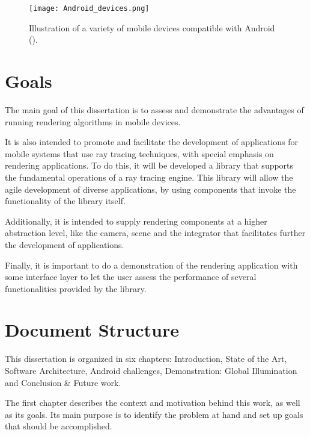 \begin{figure}[H]
	\centering
	\caption{Illustration of a variety of mobile devices compatible with Android (\cite{AndroidDevices}).}
	\label{Illustration of a variety of mobile devices compatible with Android}
	\texttt{[image: Android\_devices.png]}
\end{figure}


\section{Goals}

\par
The main goal of this dissertation is to assess and demonstrate the advantages of running rendering algorithms in mobile devices.

\par
It is also intended to promote and facilitate the development of applications for mobile systems that use ray tracing techniques, with special emphasis on rendering applications.
To do this, it will be developed a library that supports the fundamental operations of a ray tracing engine.
This library will allow the agile development of diverse applications, by using components that invoke the functionality of the library itself.

\par
Additionally, it is intended to supply rendering components at a higher abstraction level, like the camera, scene and the integrator that facilitates further the development of applications.

\par
Finally, it is important to do a demonstration of the rendering application with some interface layer to let the user assess the performance of several functionalities provided by the library.

\section{Document Structure}

\par
This dissertation is organized in six chapters: Introduction, State of the Art, Software Architecture, Android challenges, Demonstration: Global Illumination and Conclusion \& Future work.

\par
The first chapter describes the context and motivation behind this work, as well as its goals.
Its main purpose is to identify the problem at hand and set up goals that should be accomplished.

